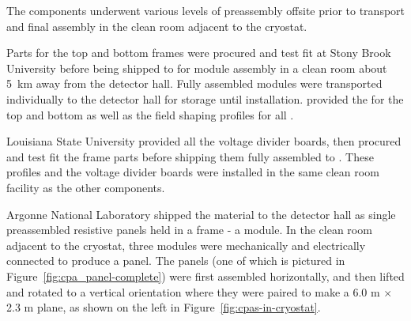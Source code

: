 The   components underwent %
various levels of preassembly offsite prior to transport and final assembly in the  clean room adjacent to the cryostat.

Parts for the top and bottom  frames were procured and test fit at Stony Brook University before being shipped to  for module assembly in a clean room about \SI{5}{km} away from the detector hall.
Fully assembled modules were transported individually to the detector hall for storage until installation.  provided the  for the top and bottom  as well as the field shaping profiles for all .


Louisiana State University provided all the voltage divider boards, then procured and test fit the  frame parts before shipping them fully assembled to .
These profiles and the voltage divider boards were installed in the same  clean room facility as the other  components.

Argonne National Laboratory shipped the  material to the detector hall as single preassembled resistive panels held in a \frfour frame - a  module. 
In the clean room adjacent to the  cryostat, three  modules were mechanically and electrically connected to produce a  panel. %
The  panels (one of which is pictured in Figure~\ref{fig:cpa_panel-complete}) were first assembled horizontally, and then lifted and rotated to a vertical orientation where they were paired to make a 6.0 m $\times$ 2.3 m  plane, as shown on the left in Figure~\ref{fig:cpas-in-cryostat}.

